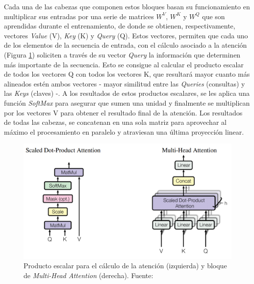 \documentclass[a4paper]{article}
\begin{document}
Cada una de las cabezas que componen estos bloques basan su funcionamiento en multiplicar sus entradas por una serie de matrices $W^V$, $W^K$ y $W^Q$ que son aprendidas durante el entrenamiento, de donde se obtienen, respectivamente, vectores \textit{Value} (V), \textit{Key} (K) y \textit{Query} (Q). Estos vectores, permiten que cada uno de los elementos de la secuencia de entrada, con el cálculo asociado a la atención (Figura \ref{fig:multi-head-attention}) soliciten a través de su vector \textit{Query} la información que determinen más importante de la secuencia. Esto se consigue al calcular el producto escalar de todos los vectores Q con todos los vectores K, que resultará mayor cuanto más alineados estén ambos vectores - mayor similitud entre las \textit{Queries} (consultas) y las \textit{Keys} (claves) -. A los resultados de estos productos escalares, se les aplica una función \textit{SoftMax} para asegurar que sumen una unidad y finalmente se multiplican por los vectores V para obtener el resultado final de la atención. Los resultados de todas las cabezas, se concatenan en una sola matriz para aprovechar al máximo el procesamiento en paralelo y atraviesan una última proyección linear.
\begin{figure}[H]
\centering
\includegraphics[width=0.65\linewidth]{imagenes/multi-head-attention.png} 
\captionsetup{width=.8\linewidth}
\caption{Producto escalar para el cálculo de la atención (izquierda) y bloque de \textit{Multi-Head Attention} (derecha). Fuente: \cite{NIPS2017_3f5ee243}}
\label{fig:multi-head-attention}
\end{figure}

\end{document}
